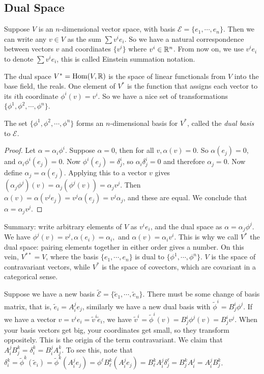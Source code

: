 \subsection{Dual Space}
Suppose $V$ is an $n$-dimensional vector space, with basis $\mathcal{E} =\{e_1,\cdots ,e_n \} $. Then we can write any $v \in V$ as the sum $\sum v^i e_i $. So we have a natural correspondence between vectors $v$ and coordinates $\{v^i \} $ where $v^i  \in \mathbb{R}^n $. From now on, we use $v^i e_i $ to denote $\sum v^i e_i $, this is called Einstein summation notation.

The dual space $V^*= \operatorname{Hom}(V, \mathbb{R})$ is the space of linear functionals from $V$ into the base field, the reals. One element of $V^*$ is the function that assigns each vector to its $i$th coordinate $\phi^i (v)=v^i $. So we have a nice set of transformations $\{\phi^1,\phi ^2,\cdots , \phi ^n \} $.
\begin{claim}
    The set $\{\phi^1,\phi^2,\cdots ,\phi^n \} $ forms an $n$-dimensional basis for $V^*$, called the \emph{dual basis} to $\mathcal{E} $.
\end{claim}
\begin{proof}
    Let $\alpha =\alpha _i \phi^i $. Suppose $\alpha =0$, then for all $v, \alpha (v)=0$. So $\alpha(e_j )=0$, and $\alpha _i \phi ^i (e_j )=0$. Now $\phi^i (e_j )=\delta^i _j $, so $\alpha _i \delta^i _j =0$ and therefore $\alpha _j =0$. Now define $\alpha _j =\alpha (e_j )$. Applying this to a vector $v$ gives $(\alpha _j  \phi^j)(v)=\alpha _j (\phi ^j(v))=\alpha _j v^j$. Then $\alpha (v)=\alpha (v^je_j )=v^j \alpha (e_j )=v^j\alpha _j $, and these are equal. We conclude that $\alpha =\alpha _j v^j$.
\end{proof}
Summary: write arbitrary elements of $V$ as $v^i e_i $, and the dual space as $\alpha =\alpha _j \phi ^j$. We have $\phi^j(v)=v^j, \alpha (e_i )=\alpha _i ,$ and $\alpha (v)=\alpha_i  v^i $. This is why we call $V^*$ the dual space: pairing elements together in either order gives a number. On this vein, $V^{* *}=V$, where the basis $\{e_1,\cdots ,e_n \} $ is dual to $\{\phi^1,\cdots ,\phi^n \} $. $V$ is the space of contravariant vectors, while $V^*$ is the space of covectors, which are covariant in a categorical sense. 

Suppose we have a new basis $\widetilde {\mathcal{E}}= \{\widetilde e_1,\cdots , \widetilde e_n \}  $. There must be some change of basis matrix, that is, $\widetilde e_i = A_i ^j e_j $, similarly we have a new dual basis with $\widetilde \phi^i =B^i _j \phi^j$. If we have a vector $v=v^i e_i =\widetilde v^i \widetilde e_i $, we have $\widetilde v^i =\widetilde \phi^i (v)=B^i _j \phi^j(v)=B^i _j v^j$. When your basis vectors get big, your coordinates get small, so they transform oppositely. This is the origin of the term contravariant. We claim that $A_i ^j B_j ^k= \delta _i ^k=B_i ^j A_j ^k$. To see this, note that $\delta_i ^k= \widetilde \phi^k(\widetilde e_i )=\widetilde \phi^k(A_i^je_j )=\phi^{\ell}B_{\ell}^k (A_i ^je_j )=B_{\ell}^kA_i ^j \delta _j ^{\ell}=B_j ^kA_i ^j=A_i ^jB_j ^k$. 

